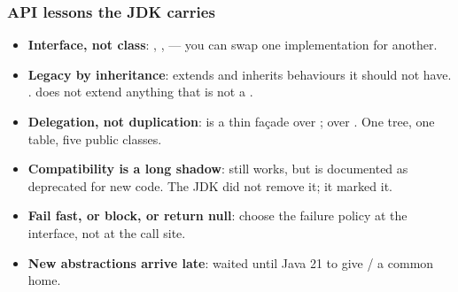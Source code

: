 \documentclass[aspectratio=169,10pt,compress]{beamer}
\begin{document}




\begin{frame}[t,fragile] \frametitle{API lessons the JDK carries}
  \begin{itemize}
    \item \textbf{Interface, not class}: , ,
           --- you can swap one implementation for another.
    \item \textbf{Legacy by inheritance}:  extends
           and inherits behaviours it should not have.
          .  does not extend anything
          that is not a .
    \item \textbf{Delegation, not duplication}:  is a
          thin façade over ;  over
          . One tree, one table, five public classes.
    \item \textbf{Compatibility is a long shadow}:  still
          works, but is documented as deprecated for new code. The JDK
          did not remove it; it marked it.
    \item \textbf{Fail fast, or block, or return null}: choose the
          failure policy at the interface, not at the call site.
    \item \textbf{New abstractions arrive late}: 
          waited until Java 21 to give / a
          common home.
  \end{itemize}
\end{frame}
\end{document}
